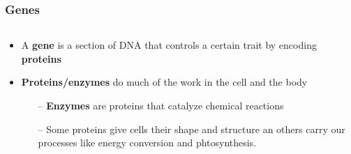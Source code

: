 \documentclass{beamer}
\begin{document}
\begin{frame}
	\frametitle{Genes}
		
	\begin{columns}
		\begin{column}{0.5\textwidth}
		\begin{itemize}
			
			\item A \textbf{gene} is a section of DNA that controls a certain trait by encoding \textbf{proteins}
			\vspace{5pt}
			\item \textbf{Proteins/enzymes} do much of the work in the cell and the body 
			\vspace{5pt}
		
					\begin{itemize}
						\scriptsize
						\item[--] \textbf{Enzymes} are proteins that catalyze chemical reactions
						\item[--] Some proteins give cells their shape and structure an others carry our processes like energy conversion and phtosynthesis.
						\end{itemize}
		\end{itemize}


\end{column}
\end{columns}
\end{frame}
\end{document}
